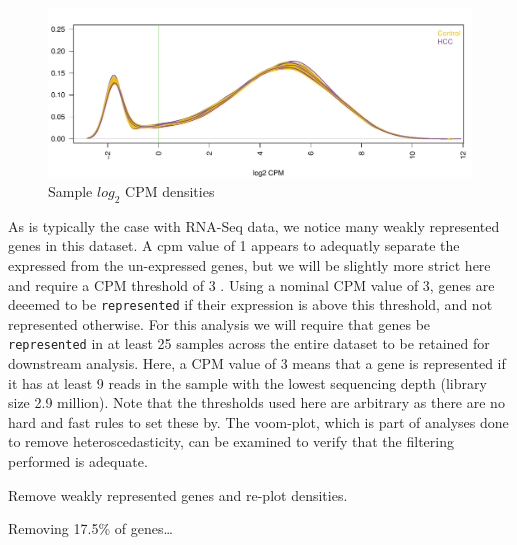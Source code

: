 \documentclass[
]{book}
\begin{document}
\begin{figure}
\centering
\includegraphics{Static/figures/hcc5hmC-preproc-densityLcpm-1.pdf}
\caption{\label{fig:hcc5hmC-preproc-densityLcpm}Sample \(log_2\) CPM densities}
\end{figure}

As is typically the case with RNA-Seq data, we notice many weakly represented genes
in this dataset. A cpm value of 1 appears to adequatly separate
the expressed from the un-expressed genes, but we will be slightly more strict here
and require a CPM threshold of 3 . Using a nominal CPM value of
3, genes are deeemed to be \texttt{represented} if their expression is
above this threshold, and not represented otherwise.
For this analysis we will require that genes be \texttt{represented} in at least
25 samples across the entire dataset to be retained for downstream analysis.
Here, a CPM value of 3 means that a gene is represented if it
has at least 9 reads in the sample with the
lowest sequencing depth (library size 2.9 million).
Note that the thresholds used here are arbitrary as there are no hard and fast
rules to set these by.
The voom-plot, which is part of analyses done to remove heteroscedasticity,
can be examined to verify that the filtering performed is adequate.

Remove weakly represented genes and re-plot densities.

Removing 17.5\% of genes\ldots{}
\end{document}
